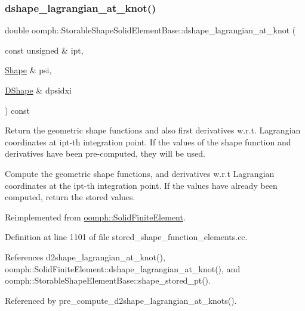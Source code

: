 \subsubsection{\texorpdfstring{dshape\+\_\+lagrangian\+\_\+at\+\_\+knot()}{dshape\_lagrangian\_at\_knot()}}
{\footnotesize\ttfamily double oomph\+::\+Storable\+Shape\+Solid\+Element\+Base\+::dshape\+\_\+lagrangian\+\_\+at\+\_\+knot (\begin{DoxyParamCaption}\item[{const unsigned \&}]{ipt,  }\item[{\hyperlink{classoomph_1_1Shape}{Shape} \&}]{psi,  }\item[{\hyperlink{classoomph_1_1DShape}{D\+Shape} \&}]{dpsidxi }\end{DoxyParamCaption}) const\hspace{0.3cm}{\ttfamily [virtual]}}



Return the geometric shape functions and also first derivatives w.\+r.\+t. Lagrangian coordinates at ipt-\/th integration point. If the values of the shape function and derivatives have been pre-\/computed, they will be used. 

Compute the geometric shape functions, and derivatives w.\+r.\+t Lagrangian coordinates at the ipt-\/th integration point. If the values have already been computed, return the stored values. 

Reimplemented from \hyperlink{classoomph_1_1SolidFiniteElement_aa48b4880f69bb28d267ff27e7b1967e7}{oomph\+::\+Solid\+Finite\+Element}.



Definition at line 1101 of file stored\+\_\+shape\+\_\+function\+\_\+elements.\+cc.



References d2shape\+\_\+lagrangian\+\_\+at\+\_\+knot(), oomph\+::\+Solid\+Finite\+Element\+::dshape\+\_\+lagrangian\+\_\+at\+\_\+knot(), and oomph\+::\+Storable\+Shape\+Element\+Base\+::shape\+\_\+stored\+\_\+pt().



Referenced by pre\+\_\+compute\+\_\+d2shape\+\_\+lagrangian\+\_\+at\+\_\+knots().

\mbox{\label{classoomph_1_1StorableShapeSolidElementBase_ace2ecd55ee9e6912c34dda8751c50e34}} 
